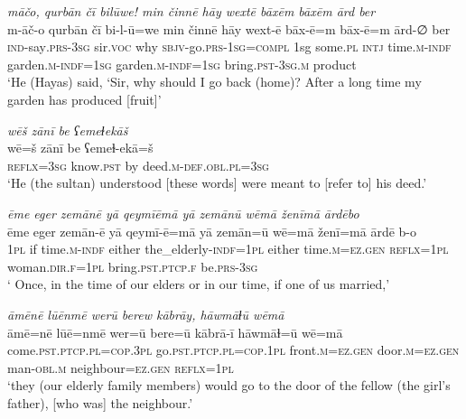 \ea \label{ŽH.113}
\textit{māčo, qurbān čī bilūwe! min činnē hāy wextē bāxēm bāxēm ārd ber} \\ 
\gll m-āč-o qurbān čī bi-l-ū=we min činnē hāy wext-ē bāx-ē=m bāx-ē=m ārd-∅ ber \\ 
 \textsc{ind-}say\textsc{.prs}\textsc{-3sg} sir.\textsc{voc} why \textsc{sbjv-}go\textsc{.prs}\textsc{-1sg}\textsc{=compl} 1sg some\textsc{.pl} \textsc{intj} time\textsc{.m}\textsc{-indf} garden\textsc{.m}\textsc{-indf}\textsc{=1sg} garden\textsc{.m}\textsc{-indf}\textsc{=1sg} bring\textsc{.pst}\textsc{-3sg}\textsc{.m} product \\ 
\glt `He (Hayas) said, ‘Sir, why should I go back (home)? After a long time my garden has produced [fruit]'
\z 
 
\ea \label{ŽH.115}
\textit{wēš zānī be ʕemeɫekāš} \\ 
\gll wē=š zānī be ʕemeɫ-ekā=š \\ 
 \textsc{reflx}\textsc{=3sg} know\textsc{.pst} by deed\textsc{.m}\textsc{-def}\textsc{.obl}\textsc{.pl}\textsc{=3sg} \\ 
\glt `He (the sultan) understood [these words] were meant to [refer to] his deed.'
\z 
 
\ea \label{RE.2}
\textit{ēme eger zemānē yā qeymīēmā yā zemānū wēmā ženīmā ārdēbo} \\ 
\gll ēme eger zemān-ē yā qeymī-ē=mā yā zemān=ū wē=mā ženī=mā ārdē b-o \\ 
 \textsc{1pl} if time\textsc{.m}\textsc{-indf} either the\_elderly\textsc{-indf}\textsc{=\textsc{1pl}} either time\textsc{.m}\textsc{\textsc{=ez.gen}} \textsc{reflx}\textsc{=\textsc{1pl}} woman\textsc{.dir}\textsc{.f}\textsc{=\textsc{1pl}} bring\textsc{.pst}\textsc{.ptcp}\textsc{.f} be\textsc{.prs}\textsc{-3sg} \\ 
\glt ` Once, in the time of our elders or in our time, if one of us married,'
\z 
 
\ea \label{RE.3}
\textit{āmēnē lūēnmē werū berew kābrāy, hāwmāɫū wēmā} \\ 
\gll āmē=nē lūē=nmē wer=ū bere=ū kābrā-ī hāwmāɫ=ū wē=mā \\ 
 come\textsc{.pst}\textsc{.ptcp}\textsc{.pl}\textsc{=cop}\textsc{.3pl} go\textsc{.pst}\textsc{.ptcp}\textsc{.pl}\textsc{=cop}\textsc{.\textsc{1pl}} front\textsc{.m}\textsc{\textsc{=ez.gen}} door\textsc{.m}\textsc{\textsc{=ez.gen}} man\textsc{-obl}\textsc{.m} neighbour\textsc{\textsc{=ez.gen}} \textsc{reflx}\textsc{=\textsc{1pl}} \\ 
\glt `they (our elderly family members) would go to the door of the fellow (the girl’s father), [who was] the neighbour.'
\z 
 
